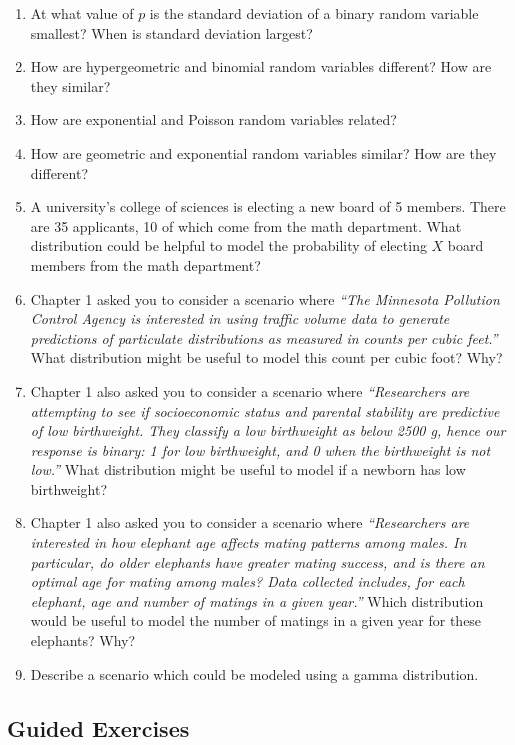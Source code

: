 \documentclass[
]{krantz}
\begin{document}
\begin{enumerate}
\def\labelenumi{\arabic{enumi}.}
\item
  At what value of \(p\) is the standard deviation of a binary random variable smallest? When is standard deviation largest?
\item
  How are hypergeometric and binomial random variables different? How are they similar?
\item
  How are exponential and Poisson random variables related?
\item
  How are geometric and exponential random variables similar? How are they different?
\item
  A university's college of sciences is electing a new board of 5 members. There are 35 applicants, 10 of which come from the math department. What distribution could be helpful to model the probability of electing \(X\) board members from the math department?
\item
  Chapter 1 asked you to consider a scenario where \emph{``The Minnesota Pollution Control Agency is interested in using traffic volume data to generate predictions of particulate distributions as measured in counts per cubic feet.''} What distribution might be useful to model this count per cubic foot? Why?
\item
  Chapter 1 also asked you to consider a scenario where \emph{``Researchers are attempting to see if socioeconomic status and parental stability are predictive of low birthweight. They classify a low birthweight as below 2500 g, hence our response is binary: 1 for low birthweight, and 0 when the birthweight is not low.''} What distribution might be useful to model if a newborn has low birthweight?
\item
  Chapter 1 also asked you to consider a scenario where \emph{``Researchers are interested in how elephant age affects mating patterns among males. In particular, do older elephants have greater mating success, and is there an optimal age for mating among males? Data collected includes, for each elephant, age and number of matings in a given year.''} Which distribution would be useful to model the number of matings in a given year for these elephants? Why?
\item
  Describe a scenario which could be modeled using a gamma distribution.
\end{enumerate}

\hypertarget{guided-exercises-2}{%
\subsection{Guided Exercises}\label{guided-exercises-2}}
\end{document}
